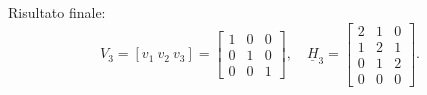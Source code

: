 \documentclass{beamer}
\begin{document}
\begin{frame}{Risultato finale:}
\[
V_3 = [v_1\ v_2\ v_3] =
\begin{bmatrix}
1 & 0 & 0\\
0 & 1 & 0\\
0 & 0 & 1
\end{bmatrix},
\quad
\underline{H}_3 =
\begin{bmatrix}
2 & 1 & 0\\
1 & 2 & 1\\
0 & 1 & 2\\
0 & 0 & 0
\end{bmatrix}.
\]

\end{frame}
\end{document}
